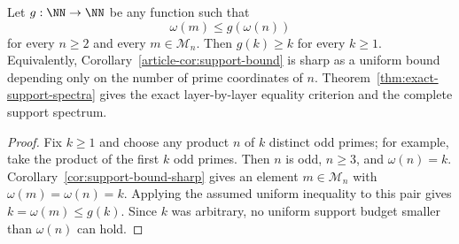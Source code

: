 \begin{corollary}
\label{cor:support-budget-best-possible}
Let $g:\NN\to\NN$ be any function such that
\[
\omega(m)\le g(\omega(n))
\]
for every $n\ge2$ and every $m\in\mathcal M_n$. Then $g(k)\ge k$ for every
$k\ge1$. Equivalently, Corollary~\ref{article-cor:support-bound} is sharp as a
uniform bound depending only on the number of prime coordinates of $n$.
Theorem~\ref{thm:exact-support-spectra} gives the exact layer-by-layer
equality criterion and the complete support spectrum.
\end{corollary}

\begin{proof}
Fix $k\ge1$ and choose any product $n$ of $k$ distinct odd primes; for
example, take the product of the first $k$ odd primes. Then $n$ is odd,
$n\ge3$, and $\omega(n)=k$. Corollary~\ref{cor:support-bound-sharp} gives an
element $m\in\mathcal M_n$ with $\omega(m)=\omega(n)=k$. Applying the assumed
uniform inequality to this pair gives $k=\omega(m)\le g(k)$. Since $k$ was
arbitrary, no uniform support budget smaller than $\omega(n)$ can hold.
\end{proof}

